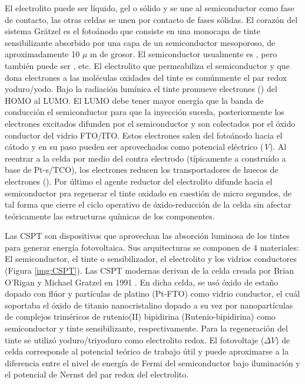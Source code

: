 
El electrolito puede ser líquido, gel o sólido y se une al semiconductor como fase de contacto, las otras celdas se unen por contacto de fases sólidas. 
El corazón del sistema Grätzel es el fotoánodo que consiste en una monocapa de tinte sensibilizante absorbido por una capa de un semiconductor mesoporoso, de aproximadamente 10 $\mu$ m de grosor. El semiconductor usualmente es , pero también puede ser , etc. El electrolito que permeabiliza el semiconductor y que dona electrones a las moléculas oxidades del tinte es comúnmente el par redox yoduro/yodo.
Bajo la radiación lumínica el tinte promueve electrones () del HOMO al LUMO. El LUMO debe tener mayor energía que la banda de conducción el semiconductor para que la inyección suceda, posteriormente los electrones excitados difunden por el semiconductor y son colectados por el óxido conductor del vidrio FTO/ITO. Estos electrones salen del fotoánodo hacia el cátodo y en su paso pueden ser aprovechados como potencial eléctrico (\textit{V}). Al reentrar a la celda por medio del contra electrodo (típicamente a construído a base de Pt-s/TCO), los electrones reducen los transportadores de huecos de electrones (). Por último el agente reductor del electrolito difunde hacia el semiconductor pra regenerar el tinte oxidado en cuestión de micro segundos, de tal forma que cierre el ciclo operativo de óxido-reducción de la celda sin afectar teóricamente las estructuras químicas de los componentes.


Las CSPT son dispositivos que aprovechan las absorción luminosa de los tintes para generar energía fotovoltaica. Sus arquitecturas se componen de 4 materiales: El semiconductor, el tinte o sensibilizador, el electrolito y los vidrios conductores (Figura \ref{img:CSPT}). Las CSPT modernas derivan de la celda creada por Brian O'Rigan y Michael Gratzel en 1991 \cite{o1991low}. En dicha celda, se usó óxido de estaño dopado con flúor y partículas de platino (Pt-FTO) como vidrio conductor, el cuál soportaba el óxido de titanio  nanocristalino dopado a su vez por nanopartículas de complejos triméricos de rutenio(II) bipidirina (Rutenio-bipidirina) como semiconductor y tinte sensibilizante, respectivamente. Para la regeneración del tinte se utilizó yoduro/triyoduro como electrolito redox. El fotovoltaje ($\Delta V$) de celda corresponde al potencial teórico de trabajo útil y puede aproximarse a la diferencia entre el nivel de energía de Fermi del semiconductor bajo iluminación y el potencial de Nernst del par redox del electrolito.


